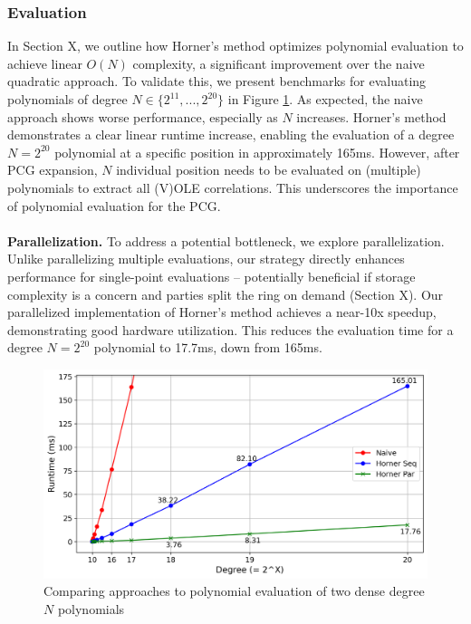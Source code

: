 \subsubsection{Evaluation}
In Section X, we outline how Horner's method optimizes polynomial evaluation to achieve linear $O(N)$ complexity, a significant improvement over the naive quadratic approach. To validate this, we present benchmarks for evaluating polynomials of degree $N \in \{2^{11}, ..., 2^{20}\}$ in Figure \ref{fig:polyEvalBench}. As expected, the naive approach shows worse performance, especially as $N$ increases. Horner's method demonstrates a clear linear runtime increase, enabling the evaluation of a degree $N=2^{20}$ polynomial at a specific position in approximately 165ms. However, after PCG expansion, $N$ individual position needs to be evaluated on (multiple) polynomials to extract all (V)OLE correlations. This underscores the importance of polynomial evaluation for the PCG.
\\\\
\textbf{Parallelization.} To address a potential bottleneck, we explore parallelization. Unlike parallelizing multiple evaluations, our strategy directly enhances performance for single-point evaluations – potentially beneficial if storage complexity is a concern and parties split the ring on demand (Section X). Our parallelized implementation of Horner's method achieves a near-10x speedup, demonstrating good hardware utilization. This reduces the evaluation time for a degree $N=2^{20}$ polynomial to 17.7ms, down from 165ms.

\begin{figure}[t]
    \centering
    \includegraphics[scale=0.49]{images/plots/poly_eval.png}
    \caption{Comparing approaches to polynomial evaluation of two dense degree $N$ polynomials}
    \label{fig:polyEvalBench}
\end{figure}


